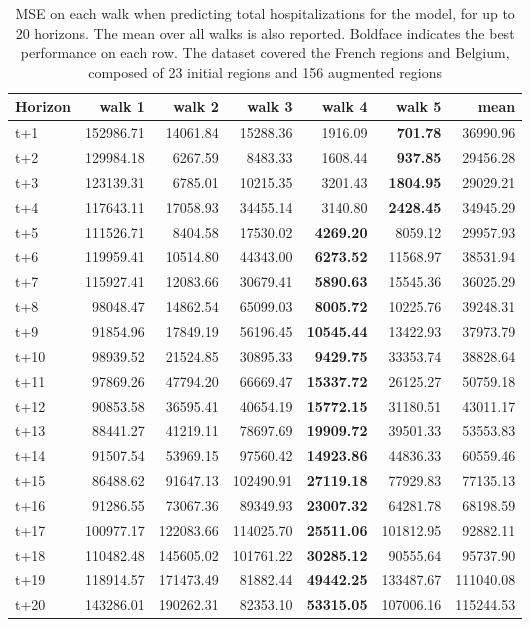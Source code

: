 \begin{table}[H]
\centering
\caption{MSE on each walk when predicting total hospitalizations for the model, for up to 20 horizons. The mean over all walks is also reported. Boldface indicates the best performance on each row. The dataset covered the French regions and Belgium, composed of 23 initial regions and 156 augmented regions }
\label{tab:MSE_walk_dense_model}
\begin{tabular}{lrrrrrr}
\toprule
Horizon &    walk 1 &    walk 2 &    walk 3 &   walk 4 &    walk 5 &      mean \\
\midrule
t+1  & 152986.71  & 14061.84  & 15288.36  & 1916.09  & \textbf{701.78}  & 36990.96  \\
t+2  & 129984.18  & 6267.59  & 8483.33  & 1608.44  & \textbf{937.85}  & 29456.28  \\
t+3  & 123139.31  & 6785.01  & 10215.35  & 3201.43  & \textbf{1804.95}  & 29029.21  \\
t+4  & 117643.11  & 17058.93  & 34455.14  & 3140.80  & \textbf{2428.45}  & 34945.29  \\
t+5  & 111526.71  & 8404.58  & 17530.02  & \textbf{4269.20}  & 8059.12  & 29957.93  \\
t+6  & 119959.41  & 10514.80  & 44343.00  & \textbf{6273.52}  & 11568.97  & 38531.94  \\
t+7  & 115927.41  & 12083.66  & 30679.41  & \textbf{5890.63}  & 15545.36  & 36025.29  \\
t+8  & 98048.47  & 14862.54  & 65099.03  & \textbf{8005.72}  & 10225.76  & 39248.31  \\
t+9  & 91854.96  & 17849.19  & 56196.45  & \textbf{10545.44}  & 13422.93  & 37973.79  \\
t+10  & 98939.52  & 21524.85  & 30895.33  & \textbf{9429.75}  & 33353.74  & 38828.64  \\
t+11  & 97869.26  & 47794.20  & 66669.47  & \textbf{15337.72}  & 26125.27  & 50759.18  \\
t+12  & 90853.58  & 36595.41  & 40654.19  & \textbf{15772.15}  & 31180.51  & 43011.17  \\
t+13  & 88441.27  & 41219.11  & 78697.69  & \textbf{19909.72}  & 39501.33  & 53553.83  \\
t+14  & 91507.54  & 53969.15  & 97560.42  & \textbf{14923.86}  & 44836.33  & 60559.46  \\
t+15  & 86488.62  & 91647.13  & 102490.91  & \textbf{27119.18}  & 77929.83  & 77135.13  \\
t+16  & 91286.55  & 73067.36  & 89349.93  & \textbf{23007.32}  & 64281.78  & 68198.59  \\
t+17  & 100977.17  & 122083.66  & 114025.70  & \textbf{25511.06}  & 101812.95  & 92882.11  \\
t+18  & 110482.48  & 145605.02  & 101761.22  & \textbf{30285.12}  & 90555.64  & 95737.90  \\
t+19  & 118914.57  & 171473.49  & 81882.44  & \textbf{49442.25}  & 133487.67  & 111040.08  \\
t+20  & 143286.01  & 190262.31  & 82353.10  & \textbf{53315.05}  & 107006.16  & 115244.53  \\

\bottomrule
\end{tabular}
\end{table}
